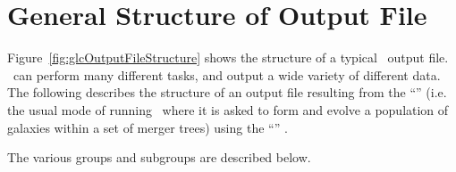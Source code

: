 \section{General Structure of Output File}\label{sec:outputFile}

Figure~\ref{fig:glcOutputFileStructure} shows the structure of a typical \glc\ output file. \glc\ can perform many different tasks, and output a wide variety of different data. The following describes the structure of an output file resulting from the ``''  (i.e. the usual mode of running \glc\ where it is asked to form and evolve a population of galaxies within a set of merger trees) using the ``'' .

The various groups and subgroups are described below.

